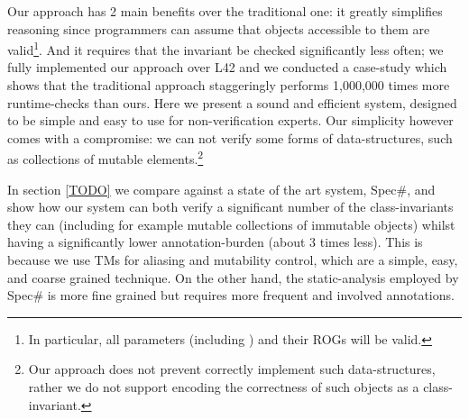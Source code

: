 Our approach has 2 main benefits over the traditional one: it greatly simplifies reasoning since programmers can assume that objects accessible to them are valid\footnote{In particular, all parameters (including \Q@this@) and their ROGs will be valid.}. And it requires that the invariant be checked significantly less often; we fully implemented our approach over L42 and we conducted a case-study which shows that the traditional approach staggeringly performs 1,000,000 times more runtime-checks than ours.
Here we present a sound and efficient system, designed to be simple and easy to use for non-verification experts. Our simplicity however comes with a compromise: we can not verify some forms of data-structures, such as collections of mutable elements.\footnote{Our approach does not prevent correctly implement such data-structures, rather we do not support encoding the correctness of such objects as a class-invariant.}

In section \ref{TODO} we compare against a state of the art system, Spec\#, and show how our system can both verify a significant number of the class-invariants they can (including for example mutable collections of immutable objects) whilst having a significantly lower annotation-burden (about 3 times less).
This is because we use TMs for aliasing and mutability control, which are a simple, easy, and coarse grained
technique. On the other hand, the static-analysis employed by Spec\# is more fine grained but requires more frequent and involved annotations.



